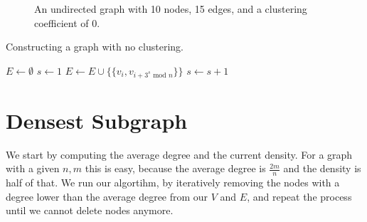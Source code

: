 \documentclass[a4paper,10pt,hidelinks]{article}
\begin{document}
\begin{figure}
    \centering
    \caption{An undirected graph with 10 nodes, 15 edges, and a clustering coefficient of 0.}
    \label{fig:graph-no-clustering}
\end{figure}

\begin{algorithm}
\caption{Constructing a graph with no clustering.}
\label{algo:algo-no-clustering}

\begin{algorithmic}
    \State $E \gets \emptyset$
    \State $s \gets 1$
    			\State $E \gets E \cup \{\{v_i, v_{i + 3^s \text{ mod } n} \}\}$
    		\EndFor
    		\State $s \gets s + 1$
    \EndWhile
\end{algorithmic}

\end{algorithm}

\section{Densest Subgraph}

We start by computing the average degree and the current density. For a graph with a given $n, m$ this is easy, because the average degree is $\frac{2m}{n}$ and the density is half of that. We run our algortihm, by iteratively removing the nodes with a degree lower than the average degree from our $V$ and $E$, and repeat the process until we cannot delete nodes anymore.
\end{document}
